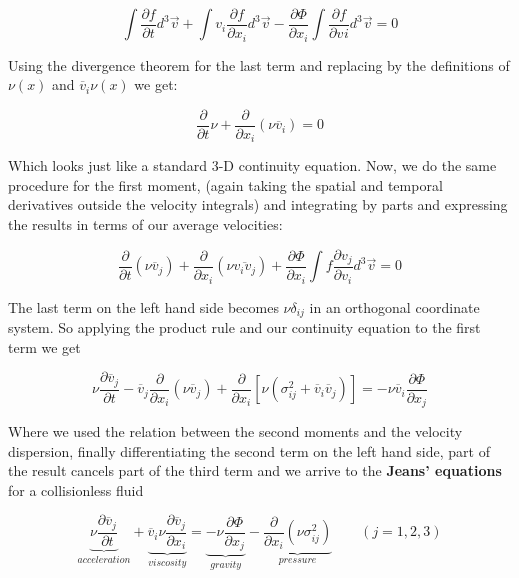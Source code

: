 \begin{equation}
\int \frac{\partial f}{\partial t}d^{3}\vec{v}+ \int v_{i}\frac{\partial f}{\partial x_{i}} d^{3}\vec{v}- \frac{\partial\Phi}{\partial x_{i}}\int \frac{\partial f}{\partial v_{}i} d^{3}\vec{v}= 0
\end{equation}

Using the divergence theorem for the last term and replacing by the definitions of $\nu(x)$ and $\overline{v}_{i}\nu(x)$ we get:

\begin{equation}
\frac{\partial}{\partial t}\nu+\frac{\partial}{\partial x_{i}}(\nu \overline{v}_{i})=0
\end{equation}

Which looks just like a standard 3-D continuity equation. Now, we do the same procedure for the first moment, (again taking the spatial and temporal derivatives outside the velocity integrals) and integrating by parts and expressing the results in terms of our average velocities:

\begin{equation}
\frac{\partial}{\partial t}(\nu \overline{v}_{j})+\frac{\partial}{\partial x_{i}}(\nu \overline{v_{i}v_{j}})+\frac{\partial \Phi}{\partial x_{i}}\int f\frac{\partial v_{j}}{\partial v_{i}}d^{3}\vec{v}=0
\end{equation} 

The last term on the left hand side becomes $\nu \delta_{ij}$ in an orthogonal coordinate system. So applying the product rule and our continuity equation to the first term we get

\begin{equation}
\nu \frac{\partial \overline{v}_{j}}{\partial t}-\overline{v}_{j}\frac{\partial}{\partial x_{i}}(\nu \overline{v}_{j})+\frac{\partial}{\partial x_{i}}[\nu(\sigma_{ij}^{2}+\overline{v}_{i}\overline{v}_{j})]=-\nu \overline{v}_{i}\frac{\partial \Phi}{\partial x_{j}}
\end{equation}

Where we used the relation between the second moments and the velocity dispersion, finally differentiating the second term on the left hand side, part of the result cancels part of the third term and we arrive to the \textbf{Jeans' equations} for a collisionless fluid

\begin{equation}	
	\underbrace{\nu \frac{\partial \overline{v}_j}{\partial t}}_{acceleration} + \underbrace{\overline{v}_i\nu \frac{\partial\overline{v}_j}{\partial x_{i}}}_{viscosity} = \underbrace{-\nu \frac{\partial\Phi}{\partial x_{j}}}_{gravity} - \underbrace{\frac{\partial}{\partial x_{i}}(\nu \sigma_{ij}^{2})}_{pressure}\quad\quad (j=1,2,3)
\end{equation}

